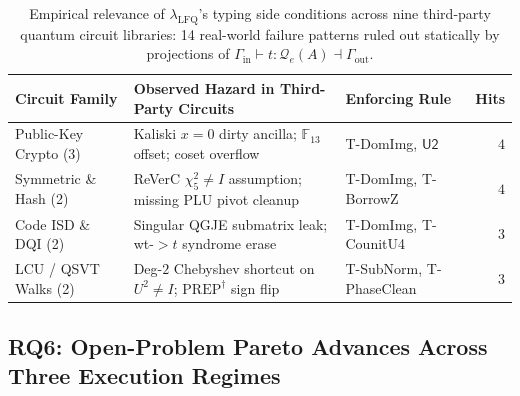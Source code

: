 \documentclass[acmsmall,screen,anonymous]{acmart}
\DeclareRobustCommand{\_}{\ifmmode\text{\char95}\else\char95\penalty0\relax\fi}
\theoremstyle{plain}
\begin{document}
\begin{table}[t]
\centering
\caption{Empirical relevance of $\lambda_{\mathrm{LFQ}}$'s typing side conditions across nine third-party quantum circuit libraries: 14 real-world failure patterns ruled out statically by projections of $\Gamma_{\mathrm{in}} \vdash t : \mathcal{Q}_{e}(A) \dashv \Gamma_{\mathrm{out}}$.}
\label{tab:t17_summary}
\footnotesize
\setlength{\tabcolsep}{4pt}
\begin{tabular}{lllr}
\toprule
Circuit Family & Observed Hazard in Third-Party Circuits & Enforcing Rule & Hits \\
\midrule
Public-Key Crypto (3) & Kaliski $x=0$ dirty ancilla; $\mathbb{F}_{13}$ offset; coset overflow & \textsf{T-DomImg}, $\mathsf{U2}$ & $4$ \\
Symmetric \& Hash (2) & ReVerC $\chi_5^2 \neq I$ assumption; missing PLU pivot cleanup & \textsf{T-DomImg}, \textsf{T-BorrowZ} & $4$ \\
Code ISD \& DQI (2) & Singular QGJE submatrix leak; wt-$>t$ syndrome erase & \textsf{T-DomImg}, \textsf{T-CounitU4} & $3$ \\
LCU / QSVT Walks (2) & Deg-$2$ Chebyshev shortcut on $U^2 \neq I$; $\mathrm{PREP}^\dagger$ sign flip & \textsf{T-SubNorm}, \textsf{T-PhaseClean} & $3$ \\
\bottomrule
\end{tabular}
\end{table}

\subsection{RQ6: Open-Problem Pareto Advances Across Three Execution Regimes}
\label{sec:sota}
\end{document}
